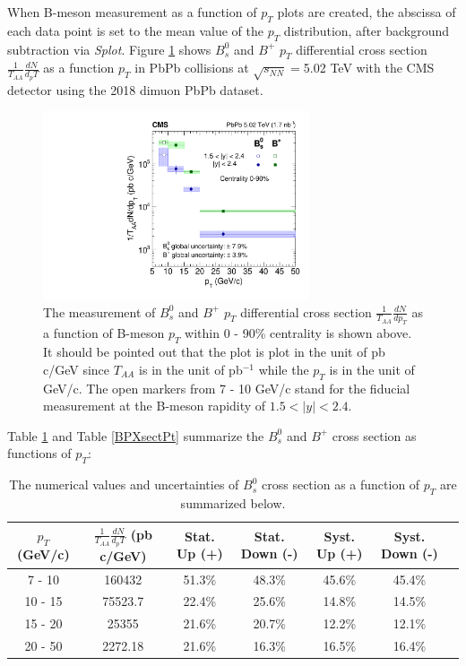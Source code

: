 When B-meson measurement as a function of $p_T$ plots are created, the abscissa of each data point is set to the mean value of the $p_T$ distribution, after background subtraction via \textit{Splot}. Figure \ref{BmesonDataPt} shows $B^0_s$ and $B^+$ $p_T$ differential cross section $\frac{1}{T_{AA}} \frac{dN}{d_pT}$ as a function $p_T$ in PbPb collisions at $\sqrt{s_{NN}} = $5.02 TeV with the CMS detector using the 2018 dimuon PbPb dataset.

\begin{figure}[hbtp]
\begin{center}
\includegraphics[width=0.70\textwidth]{Figures/Chapter5/xsec_vsPt.pdf}
\caption{The measurement of $B^0_s$ and $B^+$ $p_T$ differential cross section $\frac{1}{T_{AA}} \frac{dN}{d p_T}$ as a function of B-meson $p_T$ within 0 - 90\% centrality is shown above. It should be pointed out that the plot is plot in the unit of pb c/GeV since $T_{AA}$ is in the unit of pb$^{-1}$ while the $p_T$ is in the unit of GeV/c. The open markers from 7 - 10 GeV/c stand for the fiducial measurement at the B-meson rapidity of $1.5 < |y| < 2.4$.}
\label{BmesonDataPt}
\end{center}
\end{figure}

Table \ref{BsXsectPt} and Table \ref{BPXsectPt} summarize the $B^0_s$ and $B^+$ cross section as functions of $p_T$:

\begin{table}[h]
\begin{center}
\caption{The numerical values and uncertainties of $B^0_s$ cross section as a function of $p_T$ are summarized below.}
\vspace{1em}
\label{BsXsectPt}
  \begin{tabular}{| c | c |c | c| c| c| c|}
    \hline
$p_T$ (GeV/c) &  $\frac{1}{T_{AA}} \frac{dN}{d_pT}$ (pb c/GeV) & Stat. Up (+)   & Stat. Down (-)  &  Syst. Up (+)  &  Syst. Down (-) \\
    \hline
    \hline
 7 - 10 &   160432  &  51.3\% & 48.3\% & 45.6\% & 45.4\% \\ 
 10 - 15 & 75523.7  & 22.4\%  & 25.6\%  & 14.8\% & 14.5\% \\ 
 15 - 20 &  25355 & 21.6\%   &  20.7\% & 12.2\% & 12.1\% \\ 
 20 - 50 &  2272.18    & 21.6\%  &  16.3\% & 16.5\% &16.4\% \\ 
    \hline
    \hline
\end{tabular}
\end{center}
\end{table}


